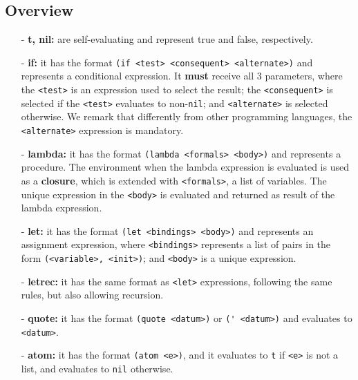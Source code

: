 \documentclass[10pt, english]{article}
\begin{document}


\subsection{Overview}

\begin{itemize}
  \item[-] \textbf{t, nil:} are self-evaluating and represent true and false, respectively.
  \item[-] \textbf{if:} it has the format \verb|(if <test> <consequent> <alternate>)| and represents a conditional expression. It \textbf{must} receive all 3 parameters, where the \verb|<test>| is an expression used to select the result; the \verb|<consequent>| is selected if the \verb|<test>| evaluates to non-\verb|nil|; and \verb|<alternate>| is selected otherwise. We remark that differently from other programming languages, the \verb|<alternate>| expression is mandatory.
  \item[-] \textbf{lambda:} it has the format \verb|(lambda <formals> <body>)| and represents a procedure. The environment when the lambda expression is evaluated is used as a \textbf{closure}, which is extended with \verb|<formals>|, a list of variables. The unique expression in the \verb|<body>| is evaluated and returned as result of the lambda expression.
  \item[-] \textbf{let:} it has the format \verb|(let <bindings> <body>)| and represents an assignment expression, where \verb|<bindings>| represents a list of pairs in the form \verb|(<variable>, <init>)|; and \verb|<body>| is a unique expression.
  \item[-] \textbf{letrec:} it has the same format as \verb|<let>| expressions, following the same rules, but also allowing recursion.
  \item[-] \textbf{quote:} it has the format \verb|(quote <datum>)| or \verb|(' <datum>)| and evaluates to \verb|<datum>|.
  \item[-] \textbf{atom:} it has the format \verb|(atom <e>)|, and it evaluates to \verb|t| if \verb|<e>| is not a list, and evaluates to \verb|nil| otherwise.

\end{itemize}
\end{document}
